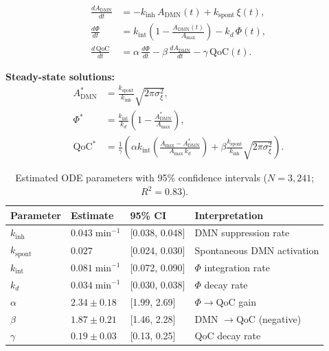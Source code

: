 \documentclass[12pt,a4paper]{article}
\theoremstyle{plain}
\theoremstyle{definition}
\theoremstyle{remark}
\newcommand{\DMN}{\mathrm{DMN}}
\begin{document}
\begin{tcolorbox}[mathbox, title={System of ODEs — Meditation Dynamics}]
\begin{align}
  \frac{d A_{\DMN}}{dt} &= -k_{\text{inh}}\,A_{\DMN}(t) + k_{\text{spont}}\,\xi(t), \label{eq:ode1}\\[4pt]
  \frac{d\Phi}{dt}      &= k_{\text{int}}\!\left(1 - \frac{A_{\DMN}(t)}{A_{\max}}\right) - k_d\,\Phi(t), \label{eq:ode2}\\[4pt]
  \frac{d\,\mathrm{QoC}}{dt} &= \alpha\,\frac{d\Phi}{dt} - \beta\,\frac{d A_{\DMN}}{dt} - \gamma\,\mathrm{QoC}(t). \label{eq:ode3}
\end{align}
\end{tcolorbox}

\textbf{Steady-state solutions:}
\begin{align}
  A_{\DMN}^*   &= \frac{k_{\text{spont}}}{k_{\text{inh}}}\sqrt{2\pi\sigma_\xi^2},\\[4pt]
  \Phi^*        &= \frac{k_{\text{int}}}{k_d}\!\left(1 - \frac{A_{\DMN}^*}{A_{\max}}\right),\\[4pt]
  \mathrm{QoC}^* &= \frac{1}{\gamma}\!\left(\alpha k_{\text{int}}\left(\frac{A_{\max} - A_{\DMN}^*}{A_{\max}\,k_d}\right)
                    + \beta\frac{k_{\text{spont}}}{k_{\text{inh}}}\sqrt{2\pi\sigma_\xi^2}\right).
\end{align}

\begin{table}[htbp]
\centering
\caption{Estimated ODE parameters with 95\% confidence intervals ($N=3{,}241$; $R^2=0.83$).}
\label{tab:ode_params}
\renewcommand{\arraystretch}{1.3}
\begin{tabular}{llll}
\toprule
\rowcolor{hdrcol}
\color{white}\textbf{Parameter} & \color{white}\textbf{Estimate} &
\color{white}\textbf{95\% CI} & \color{white}\textbf{Interpretation} \\
\midrule
$k_{\text{inh}}$ & $0.043\;\mathrm{min}^{-1}$ & [0.038, 0.048] & DMN suppression rate \\
$k_{\text{spont}}$ & $0.027$ & [0.024, 0.030] & Spontaneous DMN activation \\
$k_{\text{int}}$ & $0.081\;\mathrm{min}^{-1}$ & [0.072, 0.090] & $\Phi$ integration rate \\
$k_d$ & $0.034\;\mathrm{min}^{-1}$ & [0.030, 0.038] & $\Phi$ decay rate \\
$\alpha$ & $2.34 \pm 0.18$ & [1.99, 2.69] & $\Phi \to \mathrm{QoC}$ gain \\
$\beta$  & $1.87 \pm 0.21$ & [1.46, 2.28] & DMN $\to \mathrm{QoC}$ (negative) \\
$\gamma$ & $0.19 \pm 0.03$ & [0.13, 0.25] & QoC decay rate \\
\bottomrule
\end{tabular}
\end{table}
\end{document}
